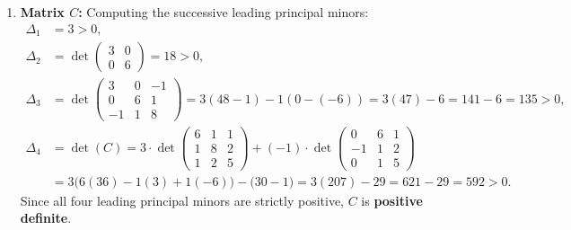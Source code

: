 \begin{exercisesolution*}
\begin{enumerate}[label=\textbf{(\alph*)}]
    \item \textbf{Matrix $C$:}
    Computing the successive leading principal minors:
    \begin{align*}
    \Delta_1 &= 3 > 0, \\
    \Delta_2 &= \det \begin{pmatrix} 3 & 0 \\ 0 & 6 \end{pmatrix} = 18 > 0, \\
    \Delta_3 &= \det \begin{pmatrix} 3 & 0 & -1 \\ 0 & 6 & 1 \\ -1 & 1 & 8 \end{pmatrix} = 3(48 - 1) - 1(0 - (-6)) = 3(47) - 6 = 141 - 6 = 135 > 0, \\
    \Delta_4 &= \det(C) = 3 \cdot \det\begin{pmatrix} 6 & 1 & 1 \\ 1 & 8 & 2 \\ 1 & 2 & 5 \end{pmatrix} + (-1) \cdot \det\begin{pmatrix} 0 & 6 & 1 \\ -1 & 1 & 2 \\ 0 & 1 & 5 \end{pmatrix} \\
    &= 3\big(6(36) - 1(3) + 1(-6)\big) - \big(30 - 1\big) = 3(207) - 29 = 621 - 29 = 592 > 0.
    \end{align*}
    Since all four leading principal minors are strictly positive, $C$ is \textbf{positive definite}. \qedhere
\end{enumerate}
\end{exercisesolution*}

